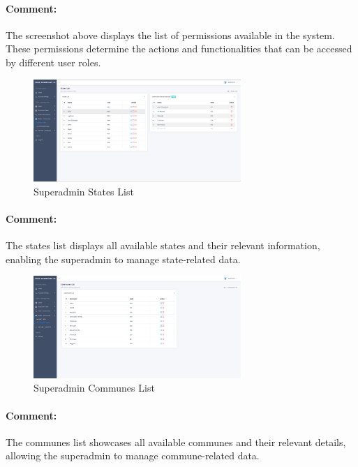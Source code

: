 \begin{itemize}
  \paragraph{Comment:} The screenshot above displays the list of permissions available in the system. These permissions determine the actions and functionalities that can be accessed by different user roles.

  \begin{figure}[htbp]
    \centering
    \includegraphics[width=0.7\textwidth]{SCREENSHOTS/superadmin/states_communes.png}
    \caption{Superadmin States List}
    \label{fig:states-list}
\end{figure}
\paragraph{Comment:} The states list displays all available states and their relevant information, enabling the superadmin to manage state-related data.
\newpage

\begin{figure}[htbp]
    \centering
    \includegraphics[width=0.7\textwidth]{SCREENSHOTS/superadmin/communes.png}
  \caption{Superadmin Communes List}
  \label{fig:communes-list}
\end{figure}
\paragraph{Comment:} The communes list showcases all available communes and their relevant details, allowing the superadmin to manage commune-related data.


\end{itemize}

